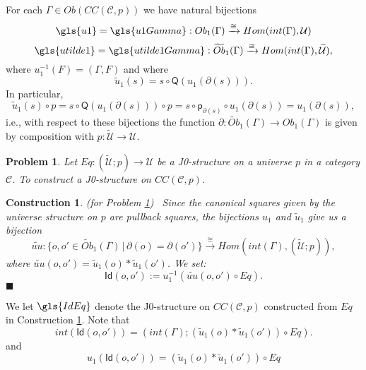 \documentclass[12pt]{article}
\numberwithin{equation}{section}
\newenvironment{eq}{\begin{equation}}{\end{equation}}
\newtheorem{problem}[proposition]{Problem}
\newtheorem{construction0}[proposition]{Construction}
\newenvironment{construction}[1]{\begin{construction0}(for Problem \ref{#1})\ }{$\blacksquare$ \end{construction0}}
\newcommand{\sr}{\rightarrow}
\newcommand{\wt}{\widetilde}
\newcommand{\toCC}{CC} %
\newcommand{\C}{{\mathcal C}}  %
\newcommand{\p}{\mathsf{p}}
\newcommand{\Id}{\mathsf{Id}} %
\newcommand{\U}{\mathcal{U}}
\newcommand{\Q}{\mathsf{Q}}
\newcommand{\Obwt}{\wt{Ob}}
\begin{document}
For each $\Gamma\in Ob(\toCC({\C},p))$ we have natural bijections
%
\begin{eq}
\label{2015.03.27.eq7b} \gls{u1} = \gls{u1Gamma}:Ob_1(\Gamma) \xrightarrow\cong Hom(int(\Gamma),\U)
\end{eq}%
%
\begin{eq}
\label{2015.03.27.eq7a} \gls{utilde1} = \gls{utilde1Gamma}:\Obwt_1(\Gamma) \xrightarrow\cong Hom(int(\Gamma),\wt{\U}),
\end{eq}%
%
where $u_1^{-1}(F)=(\Gamma,F)$ and where
%
\begin{eq}
\label{2015.03.31.eq5} \wt{u}_1(s)=s\circ \Q(u_1(\partial(s))).
\end{eq}%
%
In particular,
%
$$\wt{u}_1(s)\circ p=s\circ \Q(u_1(\partial(s)))\circ p=s\circ
\p_{\partial(s)}\circ u_1(\partial(s))=u_1(\partial(s)),$$
%
i.e., with respect to these bijections the function
$\partial:\Obwt_1(\Gamma)\sr Ob_1(\Gamma)$ is given by composition with
$p:\wt{\U}\sr \U$.
%
\begin{problem}
\label{2015.03.27.prob3} Let $Eq:(\wt{\U};p)\sr \U$ be a J0-structure on a
universe $p$ in a category $\C$. To construct a J0-structure on
$\toCC({\C},p)$.
\end{problem}
%
\begin{construction}{2015.03.27.prob3}\rm
\label{2015.03.27.constr3} Since the canonical squares given by the universe structure on $p$ are pullback squares,
the bijections $u_1$ and $\wt{u}_1$ give us a bijection
%
$$\wt{uu}:\{o,o'\in\Obwt_1(\Gamma)\,|\,\partial(o)=\partial(o')\} \xrightarrow \cong
Hom(int(\Gamma),(\wt{\U};p)),$$
%
where $\wt{uu}(o,o')=\wt{u}_1(o)*\wt{u}_1(o')$. We set:
%
$$\Id(o,o') := u_1^{-1}(\wt{uu}(o,o')\circ Eq).$$
%
\end{construction}
%
We let $\gls{IdEq}$ denote the J0-structure on $\toCC({\C},p)$ constructed
from $Eq$ in Construction \ref{2015.03.27.constr3}. Note that
%
\begin{eq}
\label{2015.03.31.eq1}
int(\Id(o,o'))=(int(\Gamma);(\wt{u}_1(o)*\wt{u}_1(o'))\circ Eq).
\end{eq}%
and
\begin{eq}
  \label{IdEq-eqn}
  u_1(\Id(o,o')) = ( \wt{u}_1(o) * \wt{u}_1(o') ) \circ Eq
\end{eq}
\end{document}
